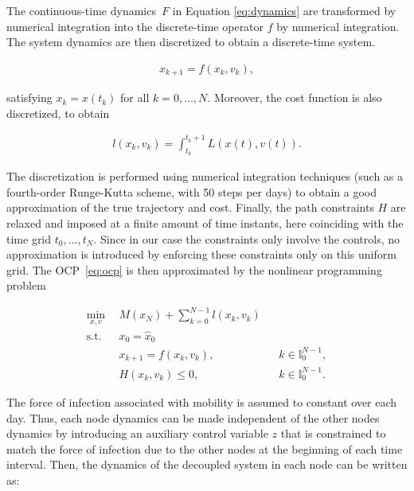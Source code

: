 The continuous-time dynamics~$F$ in Equation \eqref{eq:dynamics} are transformed by numerical integration into the discrete-time operator $f$ by numerical integration. The system dynamics are then discretized to obtain a discrete-time system.

\begin{align*}
    x_{k+1} = f(x_k,v_k),
\end{align*}

satisfying $x_k=x(t_k)$ for all $k=0,\ldots,N$. Moreover, the cost function is also discretized, to obtain

\begin{align*}
    l(x_k,v_k)=\int_{t_k}^{t_k+1} L(x(t),v(t)).
\end{align*}

The discretization is performed using numerical integration techniques (such as a fourth-order Runge-Kutta scheme, with 50 steps per days) to obtain a good approximation of the true trajectory and cost. Finally, the path constraints $H$ are relaxed and imposed at a finite amount of time instants, here coinciding with the time grid $t_0,\ldots,t_N$. Since in our case the constraints only involve the controls, no approximation is introduced by enforcing these constraints only on this uniform grid. The OCP~\eqref{eq:ocp} is then approximated by the nonlinear programming problem

\begin{subequations}
    \begin{align}
        \min_{x,v} \ \ & M(x_N)+\sum_{k=0}^{N-1} l(x_k,v_k)  \\ 
        \mathrm{s.t.} \ \ & x_0 = \hat x_0 \\
        & x_{k+1} = f(x_k,v_k), && k\in \mathbb{I}_0^{N-1}, \\
        &H(x_k,v_k)\leq 0, && k\in \mathbb{I}_0^{N-1}.
    \end{align}
        \label{eq:ocp_nlp}
\end{subequations}

The force of infection associated with mobility is assumed to constant over each day. Thus, each node dynamics can be made independent of the other nodes dynamics by introducing an auxiliary control variable $z$ that is constrained to match the force of infection due to the other nodes at the beginning of each time interval. Then, the dynamics of the decoupled system in each node can be written as:

